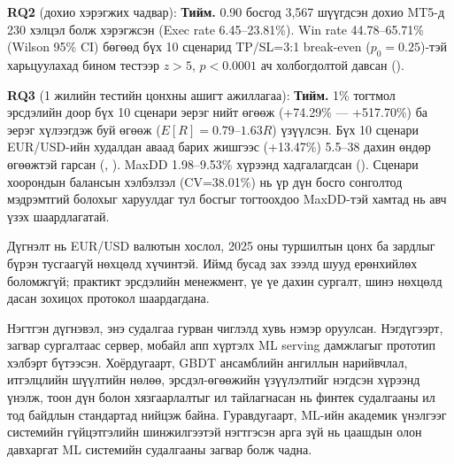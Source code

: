 \textbf{RQ2} (дохио хэрэгжих чадвар): \textbf{Тийм.} 0.90 босгод 3{,}567 шүүгдсэн дохио MT5-д 230 хэлцэл болж хэрэгжсэн (Exec rate 6.45--23.81\%). Win rate 44.78--65.71\% (Wilson 95\% CI) бөгөөд бүх 10 сценарид TP/SL=3:1 break-even ($p_0=0.25$)-тэй харьцуулахад бином тестээр $z>5$, $p<0.0001$ ач холбогдолтой давсан ().

\textbf{RQ3} (1 жилийн тестийн цонхны ашигт ажиллагаа): \textbf{Тийм.} 1\% тогтмол эрсдэлийн доор бүх 10 сценари эерэг нийт өгөөж (+74.29\% --- +517.70\%) ба эерэг хүлээгдэж буй өгөөж ($E[R]=0.79\text{--}1.63R$) үзүүлсэн. Бүх 10 сценари EUR/USD-ийн худалдан аваад барих жишгээс (+13.47\%) 5.5--38 дахин өндөр өгөөжтэй гарсан (, ). MaxDD 1.98--9.53\% хүрээнд хадгалагдсан (). Сценари хоорондын балансын хэлбэлзэл (CV=38.01\%) нь үр дүн босго сонголтод мэдрэмтгий болохыг харуулдаг тул босгыг тогтоохдоо MaxDD-тэй хамтад нь авч үзэх шаардлагатай.

Дүгнэлт нь EUR/USD валютын хослол, 2025 оны туршилтын цонх ба зардлыг бүрэн тусгаагүй нөхцөлд хүчинтэй. Иймд бусад зах зээлд шууд ерөнхийлөх боломжгүй; практикт эрсдэлийн менежмент, үе үе дахин сургалт, шинэ нөхцөлд дасан зохицох протокол шаардагдана.

Нэгтгэн дүгнэвэл, энэ судалгаа гурван чиглэлд хувь нэмэр оруулсан. Нэгдүгээрт, загвар сургалтаас сервер, мобайл апп хүртэлх ML serving дамжлагыг прототип хэлбэрт бүтээсэн. Хоёрдугаарт, GBDT ансамблийн ангиллын нарийвчлал, итгэлцлийн шүүлтийн нөлөө, эрсдэл-өгөөжийн үзүүлэлтийг нэгдсэн хүрээнд үнэлж, тоон дүн болон хязгаарлалтыг ил тайлагнасан нь финтек судалгааны ил тод байдлын стандартад нийцэж байна. Гуравдугаарт, ML-ийн академик үнэлгээг системийн гүйцэтгэлийн шинжилгээтэй нэгтгэсэн арга зүй нь цаашдын олон давхаргат ML системийн судалгааны загвар болж чадна.

